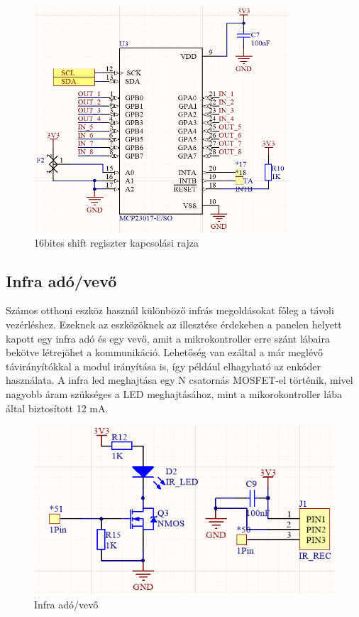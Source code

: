 \begin{figure}[!ht]
    \centering
    \includegraphics[width=95mm, keepaspectratio]{figures/16bit_shift_register.png}
    \caption{16bites shift regiszter kapcsolási rajza}
    \label{fig:shift_register}
\end{figure}


\subsection{Infra adó/vevő}
Számos otthoni eszköz használ különböző infrás megoldásokat főleg a távoli vezérléshez. Ezeknek az eszközöknek az illesztése érdekeben a panelen helyett kapott egy infra adó és egy vevő, amit a mikrokontroller erre szánt lábaira bekötve létrejöhet a kommunikáció. Lehetőség van ezáltal a már meglévő távirányítókkal a modul irányítása is, így például elhagyható az enkóder használata.
A infra led meghajtása egy N csatornás MOSFET-el történik, mivel nagyobb áram szükséges a LED meghajtásához, mint a mikorokontroller lába által biztosított 12 mA.
\begin{figure}[!ht]
    \centering
    \includegraphics[width=130mm, keepaspectratio]{figures/infra.png}
    \caption{Infra adó/vevő}
    \label{fig:ir_ado_vevo}
\end{figure}


